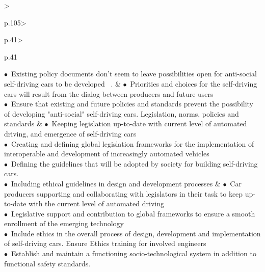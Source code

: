 \begin{table}[t]
\begin{small}
\begin{supertabular}{%
		>{\raggedright}p{.105\textwidth}>{\raggedright}p{.41\textwidth}>{\raggedright}p{.41\textwidth}}
				\noindent $\bullet$~Existing policy documents don't seem to leave possibilities open for anti-social self-driving cars to be developed~ \cite{EthicsCommission2017b,Pillath2016,NHTSA2016PolicyUpdate,DBLP:journals/corr/CharisiDFLMSSWY17}. \vspace{.2cm}%
			& \vspace{.1cm}
				\noindent $\bullet$~Priorities and choices for the self-driving cars will result from the dialog between producers and future users \\
				\noindent $\bullet$~Ensure that existing and future policies and standards prevent the possibility of developing "anti-social" self-driving cars.
 			 \tabularnewline \hline %
			\vspace{.1cm}Legislation, norms, policies and standards & \vspace{.1cm} 
				\noindent $\bullet$~Keeping legislation up-to-date with current level of automated driving, and emergence of self-driving cars \\
                \noindent $\bullet$~Creating and defining global legislation frameworks for the implementation of interoperable and development of increasingly automated vehicles\\
				\noindent $\bullet$~Defining the  guidelines that will be adopted by society for building self-driving cars. \\
				\noindent $\bullet$~Including ethical guidelines in design and development processes
			& \vspace{.1cm}
				\noindent $\bullet$~Car producers supporting and collaborating with legislators in their task to keep up-to-date with the current level of automated driving\\
				\noindent $\bullet$~Legislative support and contribution to global frameworks to ensure a smooth enrollment of the emerging technology\\
				\noindent $\bullet$~Include ethics in the overall process of design, development and implementation of self-driving cars. Ensure Ethics training for involved engineers \cite{Sapienza2016a, spiekermann2015ethical} \\
				\noindent $\bullet$~Establish and maintain a functioning socio-technological system in addition to functional safety standards.\vspace{.2cm}
 			  			 \tabularnewline %
		\end{supertabular}
	\end{small}
	
\end{table}


